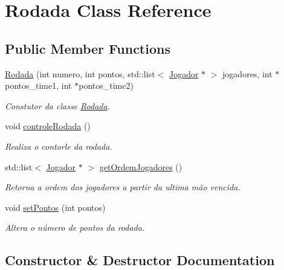 \hypertarget{class_rodada}{}\section{Rodada Class Reference}
\label{class_rodada}
\subsection*{Public Member Functions}
\begin{DoxyCompactItemize}
\item 
\mbox{\hyperlink{class_rodada_a7cdc28bfebf93073496ce43656d67c9b}{Rodada}} (int numero, int pontos, std\+::list$<$ \mbox{\hyperlink{class_jogador}{Jogador}} $\ast$ $>$ jogadores, int $\ast$pontos\+\_\+time1, int $\ast$pontos\+\_\+time2)
\begin{DoxyCompactList}\small\item\em Constutor da classe \mbox{\hyperlink{class_rodada}{Rodada}}. \end{DoxyCompactList}\item 
void \mbox{\hyperlink{class_rodada_a664981d79cf62da514b0baaf640fb08c}{controle\+Rodada}} ()
\begin{DoxyCompactList}\small\item\em Realiza o contorle da rodada. \end{DoxyCompactList}\item 
std\+::list$<$ \mbox{\hyperlink{class_jogador}{Jogador}} $\ast$ $>$ \mbox{\hyperlink{class_rodada_a16bd9d4537bd55fe5ca1fd1e7dc9659f}{get\+Ordem\+Jogadores}} ()
\begin{DoxyCompactList}\small\item\em Retorna a ordem dos jogadores a partir da ultima mão vencida. \end{DoxyCompactList}\item 
void \mbox{\hyperlink{class_rodada_aa8ca4b5f5b62991292a33188a1004fd1}{set\+Pontos}} (int pontos)
\begin{DoxyCompactList}\small\item\em Altera o número de pontos da rodada. \end{DoxyCompactList}\end{DoxyCompactItemize}


\subsection{Constructor \& Destructor Documentation}
\mbox{\label{class_rodada_a7cdc28bfebf93073496ce43656d67c9b}} 
